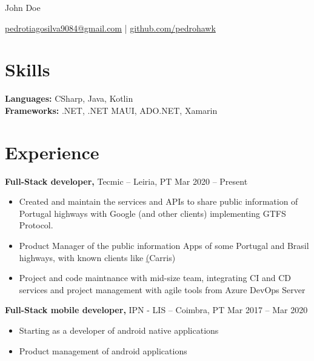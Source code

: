 \documentclass[11pt]{article}       %
\begin{document}
\centerline{\Huge John Doe}

\vspace{5pt}

\centerline{\href{mailto:pedrotiagosilva9084@gmail.com}{pedrotiagosilva9084@gmail.com} | \href{https://github.com/pedrohawk}{github.com/pedrohawk}}

\vspace{-10pt}

\section*{Skills}
\textbf{Languages:} CSharp, Java, Kotlin \\
\textbf{Frameworks:} .NET, .NET MAUI, ADO.NET, Xamarin 

\vspace{-6.5pt}

\section*{Experience}
\textbf{Full-Stack developer,} {Tecmic} -- Leiria, PT \hfill Mar 2020 -- Present \\
\vspace{-9pt}
\begin{itemize}
  \item Created and maintain the services and APIs to share public information of Portugal highways with Google (and other clients) implementing GTFS Protocol. 
  \item Product Manager of the public information Apps of some Portugal and Brasil highways, with known clients like \href{https://play.google.com/store/search?q=carris&c=apps}(Carris) 
  \item Project and code maintnance with mid-size team, integrating CI and CD services and project management with agile tools from Azure DevOps Server
\end{itemize}

\textbf{Full-Stack mobile developer,} {IPN - LIS} -- Coimbra, PT \hfill Mar 2017 -- Mar 2020 \\
\vspace{-9pt}
\begin{itemize}
  \item Starting as a developer of android native applications
  \item Product management of android applications
\end{itemize}
\end{document}
